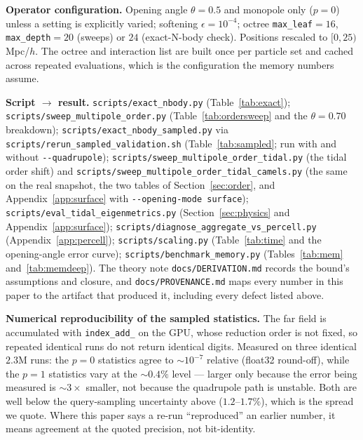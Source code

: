 \noindent\textbf{Operator configuration.} Opening angle $\theta=0.5$ and monopole only ($p=0$) unless
a setting is explicitly varied; softening $\epsilon=10^{-4}$; octree \texttt{max\_leaf}$=16$,
\texttt{max\_depth}$=20$ (sweeps) or $24$ (exact-N-body check). Positions rescaled to
$[0,25)$\,Mpc/$h$. The octree and interaction list are built once per particle set and cached across
repeated evaluations, which is the configuration the memory numbers assume.

\begin{sloppypar}
\noindent\textbf{Script $\rightarrow$ result.} \texttt{scripts/\allowbreak exact\_\allowbreak nbody.\allowbreak py}
(Table~\ref{tab:exact}); \texttt{scripts/\allowbreak sweep\_\allowbreak multipole\_\allowbreak order.\allowbreak py}
(Table~\ref{tab:ordersweep} and the $\theta=0.70$ breakdown);
\texttt{scripts/\allowbreak exact\_\allowbreak nbody\_\allowbreak sampled.\allowbreak py} via \texttt{scripts/\allowbreak rerun\_\allowbreak sampled\_\allowbreak validation.\allowbreak sh}
(Table~\ref{tab:sampled}; run with and without \texttt{-{}-quadrupole});
\texttt{scripts/\allowbreak sweep\_\allowbreak multipole\_\allowbreak order\_\allowbreak tidal.\allowbreak py} (the tidal order shift) and
\texttt{scripts/\allowbreak sweep\_multipole\_order\_tidal\_camels.\allowbreak py} (the same on the real snapshot, the two
tables of Section~\ref{sec:order}, and Appendix~\ref{app:surface} with
\texttt{-{}-opening-mode surface});
\texttt{scripts/\allowbreak eval\_\allowbreak tidal\_\allowbreak eigenmetrics.\allowbreak py} (Section~\ref{sec:physics} and
Appendix~\ref{app:surface}); \texttt{scripts/\allowbreak diagnose\_\allowbreak aggregate\_\allowbreak vs\_\allowbreak percell.\allowbreak py}
(Appendix~\ref{app:percell});
\texttt{scripts/\allowbreak scaling.\allowbreak py} (Table~\ref{tab:time} and the opening-angle error curve);
\texttt{scripts/\allowbreak benchmark\_\allowbreak memory.\allowbreak py} (Tables~\ref{tab:mem} and~\ref{tab:memdeep}).
The theory note \texttt{docs/\allowbreak DERIVATION.\allowbreak md} records the bound's assumptions and closure, and
\texttt{docs/\allowbreak PROVENANCE.\allowbreak md} maps every number in this paper to the artifact that produced it,
including every defect listed above.
\end{sloppypar}

\noindent\textbf{Numerical reproducibility of the sampled statistics.} The far field is accumulated
with \texttt{index\_add\_} on the GPU, whose reduction order is not fixed, so repeated identical runs
do not return identical digits. Measured on three identical $2.3$M runs: the $p{=}0$ statistics agree
to ${\sim}10^{-7}$ relative (float32 round-off), while the $p{=}1$ statistics vary at the
${\sim}0.4\%$ level --- larger only because the error being measured is $\sim3\times$ smaller, not
because the quadrupole path is unstable. Both are well below the query-sampling uncertainty above
($1.2$--$1.7\%$), which is the spread we quote. Where this paper says a re-run ``reproduced'' an
earlier number, it means agreement at the quoted precision, not bit-identity.

